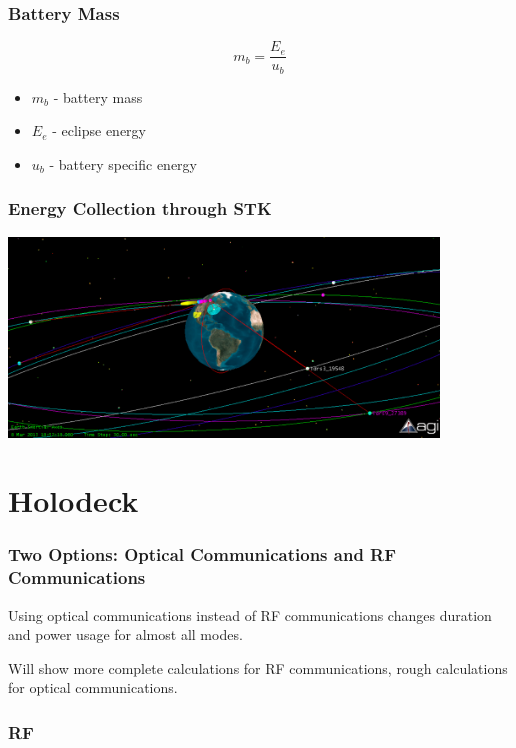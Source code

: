\documentclass{beamer}
\begin{document}
\begin{frame}
  \frametitle{Battery Mass}
  \[m_b = \frac{E_e}{u_b}\]

  \begin{itemize}
    \item $m_b$ - battery mass
    \item $E_e$ - eclipse energy
    \item $u_b$ - battery specific energy
  \end{itemize}
\end{frame}

\begin{frame}
  \frametitle{Energy Collection through STK}
  \begin{center}
    \includegraphics[width=4.5in]{img/stk}
  \end{center}
\end{frame}

\section{Holodeck}
\begin{frame}
  \frametitle{Two Options: Optical Communications and RF Communications}
  \begin{center}
    Using optical communications instead of RF communications changes
    duration and power usage for almost all modes.

    Will show more complete calculations for RF communications, rough
    calculations for optical communications.
  \end{center}
\end{frame}

\begin{frame}
  \frametitle{RF}
  \begin{center}



  \end{center}
\end{frame}
\end{document}
